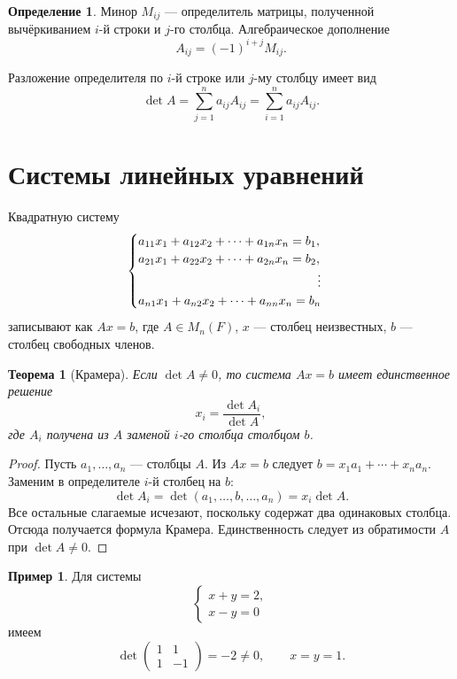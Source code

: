 \documentclass[12pt,a4paper,oneside,openany]{book}
\theoremstyle{definition}
\newtheorem{definition}{Определение}[chapter]
\newtheorem{example}{Пример}[chapter]
\theoremstyle{plain}
\newtheorem{theorem}{Теорема}[chapter]
\theoremstyle{remark}
\begin{document}
\begin{definition}
Минор $M_{ij}$ --- определитель матрицы, полученной вычёркиванием
$i$-й строки и $j$-го столбца. Алгебраическое дополнение
\[
  A_{ij}=(-1)^{i+j}M_{ij}.
\]
\end{definition}

Разложение определителя по $i$-й строке или $j$-му столбцу имеет вид
\[
  \det A=\sum_{j=1}^{n}a_{ij}A_{ij}
  =\sum_{i=1}^{n}a_{ij}A_{ij}.
\]


\section{Системы линейных уравнений}

Квадратную систему
\[
\begin{cases}
a_{11}x_1+a_{12}x_2+\cdots+a_{1n}x_n=b_1,\\
a_{21}x_1+a_{22}x_2+\cdots+a_{2n}x_n=b_2,\\
\hfill\vdots\\
a_{n1}x_1+a_{n2}x_2+\cdots+a_{nn}x_n=b_n
\end{cases}
\]
записывают как $Ax=b$, где $A\in M_n(F)$, $x$ --- столбец неизвестных,
$b$ --- столбец свободных членов.

\begin{theorem}[Крамера]
Если $\det A\ne0$, то система $Ax=b$ имеет единственное решение
\[
  x_i=\frac{\det A_i}{\det A},
\]
где $A_i$ получена из $A$ заменой $i$-го столбца столбцом $b$.
\end{theorem}

\begin{proof}
Пусть $a_1,\ldots,a_n$ --- столбцы $A$. Из $Ax=b$ следует
$b=x_1a_1+\cdots+x_na_n$. Заменим в определителе $i$-й столбец на $b$:
\[
  \det A_i
  =\det(a_1,\ldots,b,\ldots,a_n)
  =x_i\det A.
\]
Все остальные слагаемые исчезают, поскольку содержат два одинаковых
столбца. Отсюда получается формула Крамера. Единственность следует из
обратимости $A$ при $\det A\ne0$.
\end{proof}

\begin{example}
Для системы
\[
  \begin{cases}x+y=2,\\x-y=0\end{cases}
\]
имеем
\[
  \det\begin{pmatrix}1&1\\1&-1\end{pmatrix}=-2\ne0,
  \qquad x=y=1.
\]
\end{example}
\end{document}
